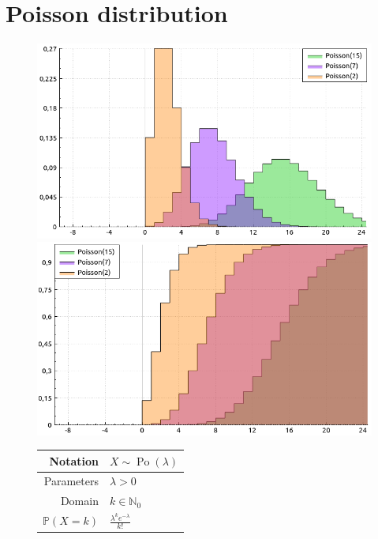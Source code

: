 \documentclass[a4paper,11pt]{article}
\theoremstyle{plain}
\theoremstyle{definition}
\newcommand{\MP}{\mathbb{P}}
\newcommand{\MN}{\mathbb{N}}
\begin{document}
	\section{Poisson distribution}
		\begin{figure}[!htb]\centering
			\begin{minipage}{0.55\textwidth}
				\includegraphics[width=\linewidth, right]{poisson_pmf}
				\captionsetup{labelformat=empty}
				\includegraphics[width=\linewidth, right]{poisson_cdf}
				\captionsetup{labelformat=empty}
			\end{minipage}
			\begin{minipage}{0.4\textwidth}
				\begin{tabular}{| r | l |}
					\hline
					Notation & $ X \sim \operatorname{Po}(\lambda) $ \\
					\hline
					Parameters & $\lambda > 0$ \\
					\hline
					Domain & $ k \in \MN_0 $  \\
					\hline
					$\MP(X = k)$ & $\frac{\lambda^k e^{-\lambda}}{k!}$ \\

\end{tabular}
\end{minipage}
\end{figure}
\end{document}
